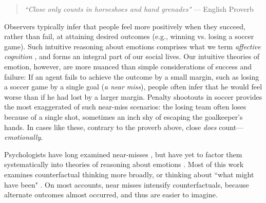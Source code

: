 \documentclass[10pt,letterpaper]{article}
\newcommand{\red}[1]{\textcolor{Red}{#1}}
\begin{document}
\begin{quote}
\textit{``Close only counts in horseshoes and hand grenades"} 
--- English Proverb
\end{quote}


	Observers typically infer that people feel more positively when they succeed, rather than fail, at attaining desired outcomes (e.g., winning vs. losing a soccer game). Such intuitive reasoning about emotions comprises what we term \textit{affective cognition} \cite{OngAffCog}, and forms an integral part of our social lives. Our intuitive theories of emotion, however, are more nuanced than simple considerations of success and failure: If an agent fails to achieve the outcome by a small margin, such as losing a soccer game by a single goal (\textit{a near miss}), people often infer that he would feel worse than if he had lost by a larger margin. Penalty shootouts in soccer provides the most exaggerated of such near-miss scenarios: the losing team often loses because of a single shot, sometimes an inch shy of escaping the goalkeeper's hands. In cases like these, contrary to the proverb above, close \textit{does} count--- \textit{emotionally}.


	Psychologists have long examined near-misses \cite{Gleicher1990, Johnson1986, Kahneman1982, Teigen1996}, but have yet to factor them systematically into theories of reasoning about emotions \cite{OngAffCog}. Most of this work examines counterfactual thinking more broadly, or thinking about ``what might have been" \cite{Bryne2002,McMullen2002, Medvec1997, Roese1997}. On most accounts, near misses intensify counterfactuals, because alternate outcomes almost occurred, and thus are easier to imagine. 

\end{document}
